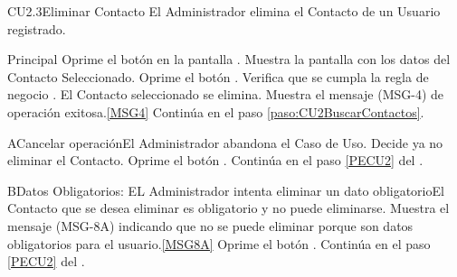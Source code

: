 	\begin{UseCase}{CU2.3}{Eliminar Contacto }{El Administrador elimina el Contacto de un Usuario registrado.}
	\end{UseCase}

	\begin{UCtrayectoria}{Principal}
			\UCpaso[\UCactor] Oprime el botón  en la pantalla .
			\UCpaso Muestra la pantalla  con los datos del Contacto Seleccionado. 
			\UCpaso [\UCactor] Oprime el botón . 
			\UCpaso Verifica que se cumpla la regla de negocio . 
			\UCpaso El Contacto seleccionado se elimina.
			\UCpaso Muestra el mensaje (MSG-4) de operación exitosa.\ref{MSG4}
			\UCpaso Continúa en el paso \ref{paso:CU2BuscarContactos}.
	\end{UCtrayectoria}

		\begin{UCtrayectoriaA}{A}{Cancelar operación}{El Administrador abandona el Caso de Uso.}
			\UCpaso[\UCactor] Decide ya no eliminar el Contacto. \label{Datos_Asoc_Contactos}
			\UCpaso[\UCactor] Oprime el botón .
			\UCpaso Continúa en el paso \ref{PECU2} del .
		\end{UCtrayectoriaA}

		\begin{UCtrayectoriaA}{B}{Datos Obligatorios: EL Administrador intenta eliminar un dato obligatorio}{El Contacto que se desea eliminar es obligatorio y no puede eliminarse.}
			\UCpaso Muestra el mensaje (MSG-8A) indicando que no se puede eliminar porque son datos obligatorios para el usuario.\ref{MSG8A}
			\UCpaso [\UCactor] Oprime el botón .
			\UCpaso Continúa en el paso \ref{PECU2} del .
		\end{UCtrayectoriaA}
